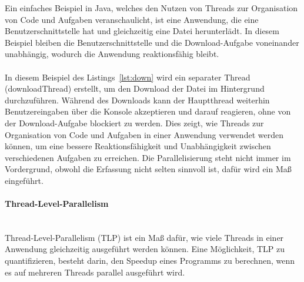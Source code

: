 \documentclass[../vs-script-first-v01.tex]{subfiles}
\begin{document}
Ein einfaches Beispiel in Java, welches den Nutzen von Threads zur Organisation von Code und Aufgaben veranschaulicht, ist eine Anwendung, die eine Benutzerschnittstelle hat und gleichzeitig eine Datei herunterlädt. In diesem Beispiel bleiben die Benutzerschnittstelle und die Download-Aufgabe voneinander unabhängig, wodurch die Anwendung reaktionsfähig bleibt.\\\\
In diesem Beispiel des Listings~\ref{lst:down} wird ein separater Thread (downloadThread) erstellt, um den Download der Datei im Hintergrund durchzuführen. Während des Downloads kann der Hauptthread weiterhin Benutzereingaben über die Konsole akzeptieren und darauf reagieren, ohne von der Download-Aufgabe blockiert zu werden. Dies zeigt, wie Threads zur Organisation von Code und Aufgaben in einer Anwendung verwendet werden können, um eine bessere Reaktionsfähigkeit und Unabhängigkeit zwischen verschiedenen Aufgaben zu erreichen. Die Parallelisierung steht nicht immer im Vordergrund, obwohl die Erfassung nicht selten sinnvoll ist, dafür wird ein Maß eingeführt.

\paragraph{Thread-Level-Parallelism\\\\}
Thread-Level-Parallelism (TLP) ist ein Maß dafür, wie viele Threads in einer Anwendung gleichzeitig ausgeführt werden können. Eine Möglichkeit, TLP zu quantifizieren, besteht darin, den Speedup eines Programms zu berechnen, wenn es auf mehreren Threads parallel ausgeführt wird.\\\\
\end{document}
